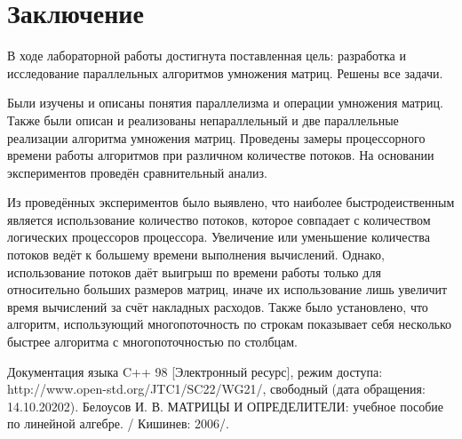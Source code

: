 \documentclass[12pt,a4paper]{report}
\begin{document}
\newpage
\chapter*{Заключение}

В ходе лабораторной работы достигнута поставленная цель: разработка и исследование параллельных
алгоритмов умножения матриц.
Решены все задачи.

Были изучены и описаны понятия параллелизма и операции умножения матриц.
Также были описан и реализованы непараллельный и две параллельные реализации алгоритма умножения
матриц.
Проведены замеры процессорного времени работы алгоритмов при различном количестве потоков.
На основании экспериментов проведён сравнительный анализ.

Из проведённых экспериментов было выявлено, что наиболее быстродеиственным является использование
количество потоков, которое совпадает с количеством логических процессоров процессора. 
Увеличение или уменьшение количества потоков ведёт к большему времени выполнения вычислений.
Однако, использование потоков даёт выигрыш по времени работы только для относительно больших
размеров матриц, иначе их использование лишь увеличит время вычислений за счёт накладных
расходов.
Также было установлено, что алгоритм, использующий многопоточность по строкам показывает себя
несколько быстрее алгоритма с многопоточностью по столбцам.

\newpage
\renewcommand\bibname{Список литературы}
\makeatletter %
\def\@biblabel#1{#1. }
\makeatother
\begin{thebibliography}{2}
     Документация языка C++ 98 [Электронный ресурс], режим доступа: http://www.open-std.org/JTC1/SC22/WG21/, свободный (дата обращения: 14.10.20202).
     Белоусов И. В. МАТРИЦЫ И ОПРЕДЕЛИТЕЛИ: учебное пособие по линейной алгебре. / Кишинев: 2006/.
\end{thebibliography}
\end{document}
